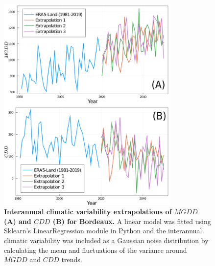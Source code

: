 \begin{figure}[H]
    \centering

    \includegraphics[width=0.8\textwidth]{Figures/MGDD_CDD_scenarios.png}
    \caption{\textbf{Interannual climatic variability extrapolations of
            $MGDD$	(A) and $CDD$ (B) for Bordeaux.} A linear model was
        fitted using
        Sklearn's LinearRegression module in Python and the interannual
        climatic
        variability was included as a Gaussian noise distribution by
        calculating the
        mean and fluctuations of the variance around $MGDD$ and $CDD$ trends.}
    \label{figS13} %
\end{figure}

